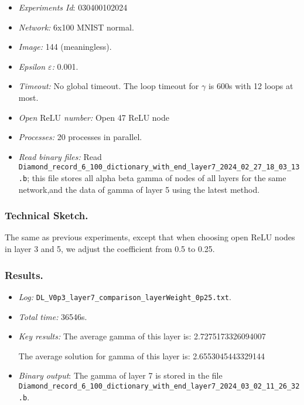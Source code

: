 \documentclass{llncs}
\newcommand{\ReLU}{\mathrm{ReLU}}
\begin{document}
\begin{itemize}
	\item\emph{Experiments Id}: 030400102024
	
	\item\emph{Network:} 6x100 MNIST normal. 
	
	\item\emph{Image:} 144 (meaningless).
	
	\item\emph{Epsilon $\varepsilon$:} 0.001.
	
	\item\emph{Timeout:} No global timeout. The loop timeout for $\gamma$ is 600s with 12 loops at most.
	
	\item\emph{Open $\ReLU$ number:} Open 47 ReLU node
	
	\item\emph{Processes:} 20 processes in parallel. 
	
	\item\emph{Read binary files:} Read \verb*|Diamond_record_6_100_dictionary_with_end_layer7_2024_02_27_18_03_13.b|; this file stores all alpha beta gamma of nodes of all layers for the same network,and the data of gamma of layer 5 using the latest method. 
\end{itemize}


\subsubsection*{Technical Sketch.}

The same as previous experiments, except that when choosing open ReLU nodes in layer 3 and 5, we adjust the coefficient from 0.5 to 0.25.



\subsubsection*{Results.}


\begin{itemize}
	\item \emph{Log:} \verb*|DL_V0p3_layer7_comparison_layerWeight_0p25.txt|.
	
	\item \emph{Total time:} 36546s.
	
	\item \emph{Key results:}  The average gamma of this layer is:  2.7275173326094007
	
	The average solution for gamma of this layer is:  2.6553045443329144
	
	\item  \emph{Binary output}: The gamma of layer 7 is stored in the file \verb*|Diamond_record_6_100_dictionary_with_end_layer7_2024_03_02_11_26_32.b|.
	
\end{itemize}
\end{document}
